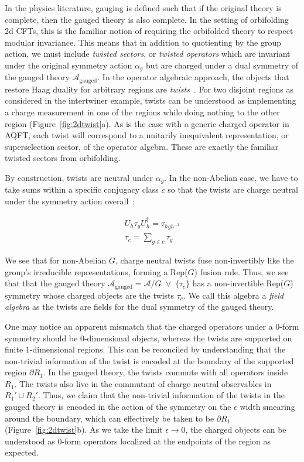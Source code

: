\documentclass{article}
\newcommand{\mA}{\mathcal{A}}
\theoremstyle{definition}
\begin{document}
  In the physics literature, gauging is defined such that if the original theory
  is complete, then the gauged theory is also complete. In the setting of orbifolding
  2d CFTs, this is the familiar notion of requiring the orbifolded theory to
  respect modular invariance. This means that in addition to quotienting by the group
  action, we must include \textit{twisted sectors}, or \textit{twisted operators}
  which are invariant under the original symmetry action $\alpha_{g}$ but are charged
  under a dual symmetry of the gauged theory $\mA_{\text{gauged}}$. In the
  operator algebraic approach, the objects that restore Haag duality for arbitrary
  regions are \textit{twists}~\cite{CasiniMagan2025ABJasU1symmetry}. For two disjoint
  regions as considered in the intertwiner example, twists can be understood as
  implementing a charge measurement in one of the regions while doing nothing to
  the other region (Figure~\ref{fig:2dtwist}a). As is the case with a generic
  charged operator in AQFT, each twist will correspond to a unitarily inequivalent
  representation, or superselection sector, of the operator algebra. These are
  exactly the familiar twisted sectors from orbifolding.

  By construction, twists are neutral under $\alpha_{g}$. In the non-Abelian
  case, we have to take sums within a specific conjugacy class $c$ so that the twists
  are charge neutral under the symmetry action overall~\cite{CasiniEntropicOrderParameters_2021}:

  \begin{eqnarray}
    U_h\tau_gU_h^\dagger = \tau_{hgh^{-1}}\\
    \tau_c = \sum_{g\in c}\tau_g
  \end{eqnarray}

  We see that for non-Abelian $G$, charge neutral twists fuse non-invertibly like
  the group's irreducible representations, forming a Rep($G$) fusion rule. Thus,
  we see that that the gauged theory $\mA_{\text{gauged}}= \mA/G\;\vee\;\{ \tau_{c}
  \}$ has a non-invertible Rep($G$) symmetry whose charged objects are the
  twists $\tau_{c}$. We call this algebra a \textit{field algebra} as the twists
  are fields for the dual symmetry of the gauged theory.

  One may notice an apparent mismatch that the charged operators under a $0$-form
  symmetry should be $0$-dimensional objects, whereas the twists are supported on
  finite $1$-dimensional regions. This can be reconciled by understanding that
  the non-trivial information of the twist is encoded at the boundary of the
  supported region $\partial R_{1}$. In the gauged theory, the twists commute
  with all operators inside $R_{1}$. The twists also live in the commutant of charge
  neutral observables in $R_{1}' \cup R_{2}'$. Thus, we claim that the non-trivial
  information of the twists in the gauged theory is encoded in the action of the
  symmetry on the $\epsilon$ width smearing around the boundary, which can
  effectively be taken to be $\partial R_{1}$ (Figure~\ref{fig:2dtwist}b). As we
  take the limit $\epsilon \to 0$, the charged objects can be understood as 0-form
  operators localized at the endpoints of the region as expected.
\end{document}
